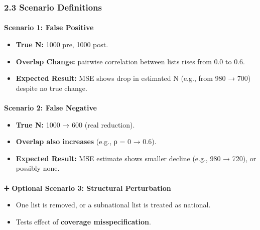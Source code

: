 \documentclass[
  12pt,
]{article}
\makeatletter
\let\oldparagraph\paragraph
\renewcommand{\paragraph}{
    \@ifstar
      \xxxParagraphStar
      \xxxParagraphNoStar
  }
\newcommand{\xxxParagraphStar}[1]{\oldparagraph*{#1}\mbox{}}
\newcommand{\xxxParagraphNoStar}[1]{\oldparagraph{#1}\mbox{}}
\theoremstyle{plain}
\theoremstyle{definition}
\makeatother
\begin{document}
\subsubsection{\texorpdfstring{\textbf{2.3 Scenario
Definitions}}{2.3 Scenario Definitions}}\label{scenario-definitions}

\paragraph{\texorpdfstring{\textbf{Scenario 1: False
Positive}}{Scenario 1: False Positive}}\label{scenario-1-false-positive}

\begin{itemize}
\item
  \textbf{True N:} 1000 pre, 1000 post.
\item
  \textbf{Overlap Change:} pairwise correlation between lists rises from
  0.0 to 0.6.
\item
  \textbf{Expected Result:} MSE shows drop in estimated N (e.g., from
  980 → 700) despite no true change.
\end{itemize}

\paragraph{\texorpdfstring{\textbf{Scenario 2: False
Negative}}{Scenario 2: False Negative}}\label{scenario-2-false-negative}

\begin{itemize}
\item
  \textbf{True N:} 1000 → 600 (real reduction).
\item
  \textbf{Overlap also increases} (e.g., ρ = 0 → 0.6).
\item
  \textbf{Expected Result:} MSE estimate shows smaller decline (e.g.,
  980 → 720), or possibly none.
\end{itemize}

\paragraph{\texorpdfstring{➕ \textbf{Optional Scenario 3: Structural
Perturbation}}{➕ Optional Scenario 3: Structural Perturbation}}\label{optional-scenario-3-structural-perturbation}

\begin{itemize}
\item
  One list is removed, or a subnational list is treated as national.
\item
  Tests effect of \textbf{coverage misspecification}.
\end{itemize}
\end{document}
